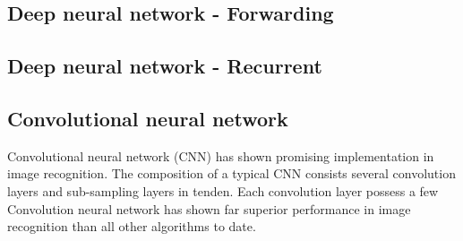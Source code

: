 \subsection{Deep neural network - Forwarding}
\subsection{Deep neural network - Recurrent}
\subsection{Convolutional neural network}
Convolutional neural network (CNN) has shown promising implementation in image recognition. The composition of a typical CNN consists several convolution layers and sub-sampling layers in tenden. Each convolution layer possess a few
Convolution neural network has shown far superior performance in image recognition than all other algorithms to date.~\cite{Szegedy_2015}